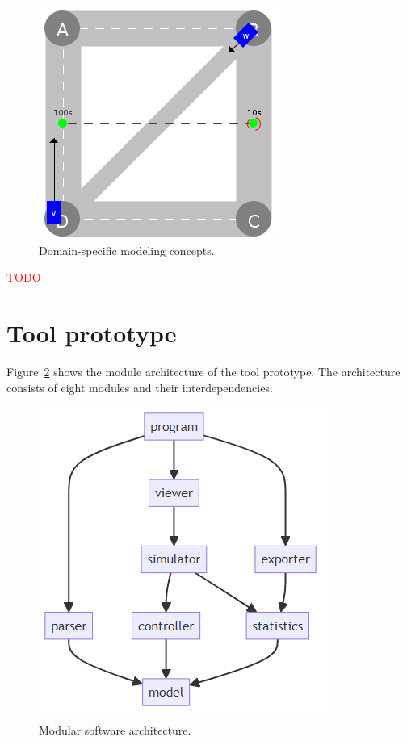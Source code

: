 \documentclass[10pt,twocolumn]{article}
\begin{document}
\begin{figure}[tbp]
	\centering
	\includegraphics[width=0.6\columnwidth]{../../events/demand.png}
	\caption{Domain-specific modeling concepts.}
	\label{fig:domain-specific-modeling}
\end{figure}

\textcolor{red}{TODO}

\section{Tool prototype}
\label{sec:tool-prototype}

Figure~\ref{fig:software-architecture} shows the module architecture of the tool prototype.
The architecture consists of eight modules and their interdependencies.

\begin{figure}[h!]
    \centering
    \includegraphics[scale=0.4]{../../diagrams/architecture-v2.png}
    \caption{Modular software architecture.}
    \label{fig:software-architecture}
\end{figure}
\end{document}
